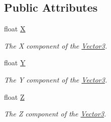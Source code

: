 \subsection*{Public Attributes}
\begin{DoxyCompactItemize}
\item 
float \hyperlink{struct_open_t_k_1_1_vector3_aa5d71ea5b15826145ddd9606235aa4f5}{X}
\begin{DoxyCompactList}\small\item\em The X component of the \hyperlink{struct_open_t_k_1_1_vector3}{Vector3}. \end{DoxyCompactList}\item 
float \hyperlink{struct_open_t_k_1_1_vector3_ae8f1c909251ac095a9baff7bdd7b185c}{Y}
\begin{DoxyCompactList}\small\item\em The Y component of the \hyperlink{struct_open_t_k_1_1_vector3}{Vector3}. \end{DoxyCompactList}\item 
float \hyperlink{struct_open_t_k_1_1_vector3_a1fc1f991eabe71caaafeab3585f658e0}{Z}
\begin{DoxyCompactList}\small\item\em The Z component of the \hyperlink{struct_open_t_k_1_1_vector3}{Vector3}. \end{DoxyCompactList}\end{DoxyCompactItemize}
